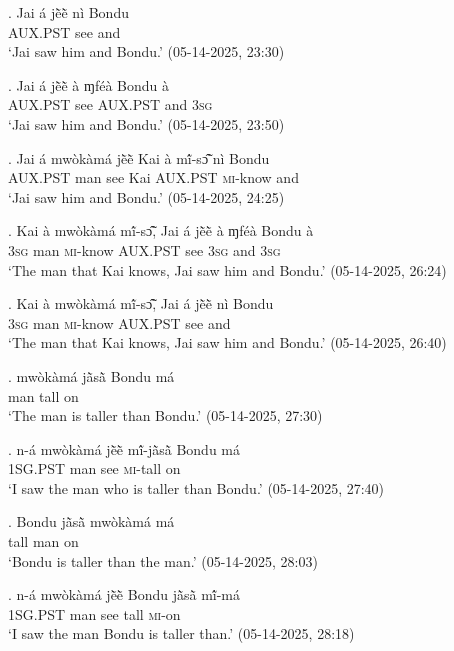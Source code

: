 \documentclass{assets/fieldnotes}
\begin{document}
\exg. Jai á jẽ̀ẽ̀ nì Bondu\\
{} \textsc{AUX.PST} see and {}\\
`Jai saw him and Bondu.’ \hfill{(05-14-2025, 23:30)}

\exg. Jai á jẽ̀ẽ̀ à ɱféà Bondu à \\
{} \textsc{AUX.PST} see \textsc{AUX.PST} and {} \textsc{3sg}\\
`Jai saw him and Bondu.’ \hfill{(05-14-2025, 23:50)}

\exg. Jai á mwòkàmá jẽ̀ẽ̀ Kai à mĩ́-sɔ̃̂ nì Bondu \\
{} \textsc{AUX.PST} man see Kai \textsc{AUX.PST} \textsc{mi}-know and {}\\
`Jai saw him and Bondu.’ \hfill{(05-14-2025, 24:25)}

\exg. Kai à mwòkàmá mĩ́-sɔ̃̂, Jai á jẽ̀ẽ̀ à ɱféà Bondu à\\
{} \textsc{3sg} man \textsc{mi}-know {} \textsc{AUX.PST} see \textsc{3sg} and {} \textsc{3sg}\\
`The man that Kai knows, Jai saw him and Bondu.’ \hfill{(05-14-2025, 26:24)}

\exg. Kai à mwòkàmá mĩ́-sɔ̃̂, Jai á jẽ̀ẽ̀ nì Bondu\\
{} \textsc{3sg} man \textsc{mi}-know {} \textsc{AUX.PST} see and {}\\
`The man that Kai knows, Jai saw him and Bondu.’ \hfill{(05-14-2025, 26:40)}

\exg. mwòkàmá jã̀sã̀ Bondu má\\
man tall {} on\\
`The man is taller than Bondu.’ \hfill{(05-14-2025, 27:30)}

\exg. n-á mwòkàmá jẽ̀ẽ̀ mĩ́-jã̀sã̀ Bondu má\\
\textsc{1SG.PST} man see \textsc{mi}-tall {} on\\
`I saw the man who is taller than Bondu.’ \hfill{(05-14-2025, 27:40)}

\exg. Bondu jã̀sã̀ mwòkàmá má\\
{} tall man on\\
`Bondu is taller than the man.’ \hfill{(05-14-2025, 28:03)}

\exg. n-á mwòkàmá jẽ̀ẽ̀ Bondu jã̀sã̀ mĩ́-má\\
\textsc{1SG.PST} man see {} tall \textsc{mi}-on\\
`I saw the man Bondu is taller than.’ \hfill{(05-14-2025, 28:18)}
\end{document}

